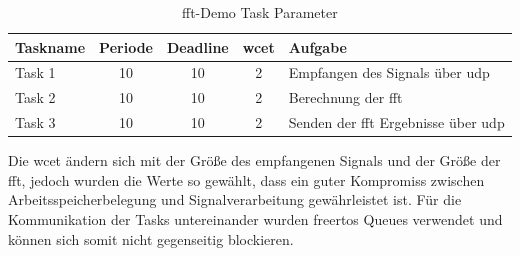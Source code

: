 \documentclass[../EDF Master Thesis.tex]{subfiles}
\begin{document}
            \begin{table}[ht!]
                \centering
                \begin{tabular}{l|c|c|c|l}
                    Taskname & Periode & Deadline & \ac{wcet} & Aufgabe \\
                    \hline
                    Task 1 & 10 & 10 & 2 & Empfangen des Signals über \ac{udp}\\
                    Task 2 & 10 & 10 & 2 & Berechnung der \ac{fft}\\
                    Task 3 & 10 & 10 & 2 & Senden der \ac{fft} Ergebnisse über \ac{udp}
                \end{tabular}
                \caption{\ac{fft}-Demo Task Parameter}
                \label{table:fft_demo_task_parameter}
            \end{table}

            Die \ac{wcet} ändern sich mit der Größe des empfangenen Signals und der Größe der \ac{fft}, jedoch wurden die Werte so gewählt, dass ein guter Kompromiss zwischen Arbeitsspeicherbelegung und Signalverarbeitung gewährleistet ist.
            Für die Kommunikation der Tasks untereinander wurden \ac{freertos} Queues verwendet und können sich somit nicht gegenseitig blockieren.
\end{document}
